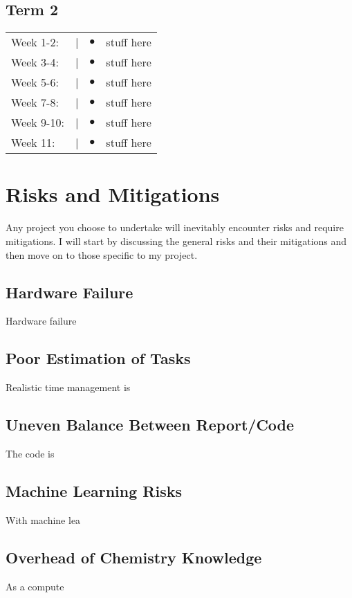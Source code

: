 \documentclass[12pt]{article}
\begin{document}
\subsection{Term 2}
\begin{tabular}{@{}p{2cm}@{}>{\raggedright\arraybackslash}p{0.5cm}@{}>{\raggedright\arraybackslash}p{0.5cm}@{}p{12cm}}
Week 1-2: & \textcolor{black}{|} & $\bullet$ & stuff here \\
Week 3-4: & \textcolor{black}{|} & $\bullet$ & stuff here \\
Week 5-6: & \textcolor{black}{|} & $\bullet$ & stuff here \\
Week 7-8: & \textcolor{black}{|} & $\bullet$ & stuff here \\
Week 9-10: & \textcolor{black}{|} & $\bullet$ & stuff here \\
Week 11: & \textcolor{black}{|} & $\bullet$ & stuff here \\
\end{tabular}


\section{Risks and Mitigations}
Any project you choose to undertake will inevitably encounter risks and require mitigations. I will start by discussing the general risks and their mitigations and then move on to those specific to my project.

\subsection{Hardware Failure}
Hardware failure

\subsection{Poor Estimation of Tasks}
Realistic time management is 

\subsection{Uneven Balance Between Report/Code}
The code is

\subsection{Machine Learning Risks}
With machine lea

\subsection{Overhead of Chemistry Knowledge}
As a compute
\end{document}
